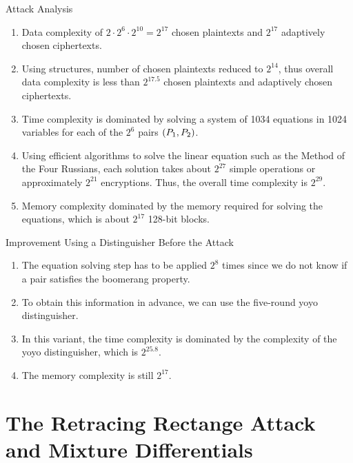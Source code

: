 \documentclass[notheorems]{beamer}
\theoremstyle{definition}
\theoremstyle{example}
\begin{document}
    \begin{frame}[<+->]{Attack Analysis}
        \begin{enumerate}
            \item Data complexity of \(2 \cdot 2^6 \cdot 2^{10} = 2^{17}\)
            chosen plaintexts and \(2^{17}\) adaptively chosen ciphertexts.
            \item Using structures, number of chosen plaintexts reduced to
            \(2^{14}\), thus overall data complexity is less than \(2^{17.5}\)
            chosen plaintexts and adaptively chosen ciphertexts.
            \item Time complexity is dominated by solving a system of 1034
            equations in 1024 variables for each of the \(2^6\) pairs
            \((P_1, P_2)\).
            \item Using efficient algorithms to solve the linear equation such
            as the Method of the Four Russians, each solution takes about
            \(2^{27}\) simple operations or approximately \(2^{21}\)
            encryptions. Thus, the overall time complexity is \(2^{29}\).
            \item Memory complexity dominated by the memory required for solving
            the equations, which is about \(2^{17}\) 128-bit blocks.
        \end{enumerate}
    \end{frame}

    \begin{frame}[<+->]{Improvement Using a Distinguisher Before the Attack}
        \begin{enumerate}
            \item The equation solving step has to be applied \(2^8\) times
            since we do not know if a pair satisfies the boomerang property.
            \item To obtain this information in advance, we can use the
            five-round yoyo distinguisher.
            \item In this variant, the time complexity is dominated by the
            complexity of the yoyo distinguisher, which is \(2^{25.8}\).
            \item The memory complexity is still \(2^{17}\).
        \end{enumerate}
    \end{frame}

    \section[Retracing Rectangle Attack]{The Retracing Rectange Attack and Mixture Differentials}
    \label{sec:retracing-rectangle}
\end{document}
